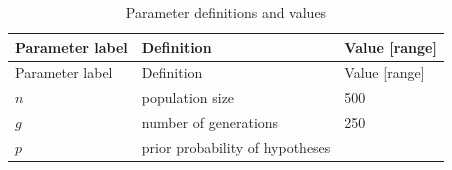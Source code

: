 \documentclass[british,,man,mask,floatsintext]{apa6}
\begin{document}
\begin{longtable}[]{@{}lll@{}}
\caption{Parameter definitions and values}\tabularnewline
\toprule
\begin{minipage}[b]{0.32\columnwidth}\raggedright
Parameter label\strut
\end{minipage} & \begin{minipage}[b]{0.32\columnwidth}\raggedright
Definition\strut
\end{minipage} & \begin{minipage}[b]{0.27\columnwidth}\raggedright
Value {[}range{]}\strut
\end{minipage}\tabularnewline
\midrule
\endfirsthead
\toprule
\begin{minipage}[b]{0.32\columnwidth}\raggedright
Parameter label\strut
\end{minipage} & \begin{minipage}[b]{0.32\columnwidth}\raggedright
Definition\strut
\end{minipage} & \begin{minipage}[b]{0.27\columnwidth}\raggedright
Value {[}range{]}\strut
\end{minipage}\tabularnewline
\midrule
\endhead
\begin{minipage}[t]{0.32\columnwidth}\raggedright
\(n\)\strut
\end{minipage} & \begin{minipage}[t]{0.32\columnwidth}\raggedright
population size\strut
\end{minipage} & \begin{minipage}[t]{0.27\columnwidth}\raggedright
500\strut
\end{minipage}\tabularnewline
\begin{minipage}[t]{0.32\columnwidth}\raggedright
\(g\)\strut
\end{minipage} & \begin{minipage}[t]{0.32\columnwidth}\raggedright
number of generations\strut
\end{minipage} & \begin{minipage}[t]{0.27\columnwidth}\raggedright
250\strut
\end{minipage}\tabularnewline
\begin{minipage}[t]{0.32\columnwidth}\raggedright
\(p\)\strut
\end{minipage} & \begin{minipage}[t]{0.32\columnwidth}\raggedright
prior probability of hypotheses\strut
\end{minipage} & \begin{minipage}[t]{0.27\columnwidth}\raggedright

\end{minipage}
\end{longtable}
\end{document}
